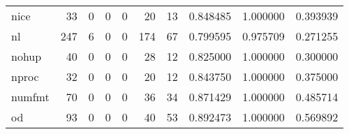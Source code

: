 \begin{longtable}{lrrrrrrrrr}
nice      &                                        33 &                                                  0 &                                                  0 &                                                  0 &                                                 20 &                                                 13 &                                           0.848485 &                               1.000000 &                             0.393939 \\
nl        &                                       247 &                                                  6 &                                                  0 &                                                  0 &                                                174 &                                                 67 &                                           0.799595 &                               0.975709 &                             0.271255 \\
nohup     &                                        40 &                                                  0 &                                                  0 &                                                  0 &                                                 28 &                                                 12 &                                           0.825000 &                               1.000000 &                             0.300000 \\
nproc     &                                        32 &                                                  0 &                                                  0 &                                                  0 &                                                 20 &                                                 12 &                                           0.843750 &                               1.000000 &                             0.375000 \\
numfmt    &                                        70 &                                                  0 &                                                  0 &                                                  0 &                                                 36 &                                                 34 &                                           0.871429 &                               1.000000 &                             0.485714 \\
od        &                                        93 &                                                  0 &                                                  0 &                                                  0 &                                                 40 &                                                 53 &                                           0.892473 &                               1.000000 &                             0.569892 \\

\end{longtable}
